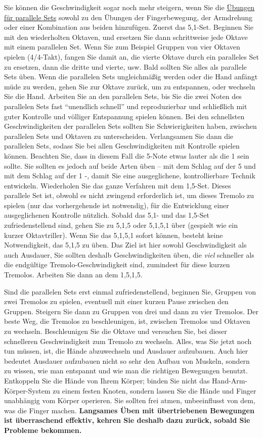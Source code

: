 Sie können die Geschwindigkeit sogar noch mehr steigern, wenn Sie die \hyperref[c1iii7b]{Übungen für parallele Sets} sowohl zu den Übungen der Fingerbewegung, der Armdrehung oder einer Kombination aus beiden hinzufügen.
Zuerst das 5,1-Set.
Beginnen Sie mit den wiederholten Oktaven, und ersetzen Sie dann schrittweise jede Oktave mit einem parallelen Set.
Wenn Sie zum Beispiel Gruppen von vier Oktaven spielen (4/4-Takt), fangen Sie damit an, die vierte Oktave durch ein paralleles Set zu ersetzen, dann die dritte und vierte, usw.
Bald sollten Sie alles als parallele Sets üben.
Wenn die parallelen Sets ungleichmäßig werden oder die Hand anfängt müde zu werden, gehen Sie zur Oktave zurück, um zu entspannen, oder wechseln Sie die Hand.
Arbeiten Sie an den parallelen Sets, bis Sie die zwei Noten des parallelen Sets fast \enquote{unendlich schnell} und reproduzierbar und schließlich mit guter Kontrolle und völliger Entspannung spielen können.
Bei den schnellsten Geschwindigkeiten der parallelen Sets sollten Sie Schwierigkeiten haben, zwischen parallelen Sets und Oktaven zu unterscheiden.
Verlangsamen Sie dann die parallelen Sets, sodass Sie bei allen Geschwindigkeiten mit Kontrolle spielen können.
Beachten Sie, dass in diesem Fall die 5-Note etwas lauter als die 1 sein sollte.
Sie sollten es jedoch auf beide Arten üben -- mit dem Schlag auf der 5 und mit dem Schlag auf der 1 -, damit Sie eine ausgeglichene, kontrollierbare Technik entwickeln.
Wiederholen Sie das ganze Verfahren mit dem 1,5-Set.
Dieses parallele Set ist, obwohl es nicht zwingend erforderlich ist, um dieses Tremolo zu spielen (nur das vorhergehende ist notwendig), für die Entwicklung einer ausgeglichenen Kontrolle nützlich.
Sobald das 5,1- und das 1,5-Set zufriedenstellend sind, gehen Sie zu 5,1,5 oder 5,1,5,1 über (gespielt wie ein kurzer Oktavtriller).
Wenn Sie das 5,1,5,1 sofort können, besteht keine Notwendigkeit, das 5,1,5 zu üben.
Das Ziel ist hier sowohl Geschwindigkeit als auch Ausdauer, Sie sollten deshalb Geschwindigkeiten üben, die \textit{viel} schneller als die endgültige Tremolo-Geschwindigkeit sind, zumindest für diese kurzen Tremolos.
Arbeiten Sie dann an dem 1,5,1,5.

Sind die parallelen Sets erst einmal zufriedenstellend, beginnen Sie, Gruppen von zwei Tremolos zu spielen, eventuell mit einer kurzen Pause zwischen den Gruppen.
Steigern Sie dann zu Gruppen von drei und dann zu vier Tremolos.
Der beste Weg, die Tremolos zu beschleunigen, ist, zwischen Tremolos und Oktaven zu wechseln.
Beschleunigen Sie die Oktave und versuchen Sie, bei dieser schnelleren Geschwindigkeit zum Tremolo zu wechseln.
Alles, was Sie jetzt noch tun müssen, ist, die Hände abzuwechseln und Ausdauer aufzubauen.
Auch hier bedeutet Ausdauer aufzubauen nicht so sehr den Aufbau von Muskeln, sondern zu wissen, wie man entspannt und wie man die richtigen Bewegungen benutzt.
Entkoppeln Sie die Hände von Ihrem Körper; binden Sie nicht das Hand-Arm-Körper-System zu einem festen Knoten, sondern lassen Sie die Hände und Finger unabhängig vom Körper operieren.
Sie sollten frei atmen, unbeeinflusst von dem, was die Finger machen.
\textbf{Langsames Üben mit übertriebenen Bewegungen ist überraschend effektiv, kehren Sie deshalb dazu zurück, sobald Sie Probleme bekommen.}

